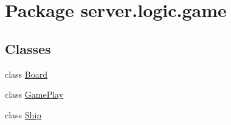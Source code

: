 \hypertarget{namespaceserver_1_1logic_1_1game}{}\section{Package server.\+logic.\+game}
\label{namespaceserver_1_1logic_1_1game}
\subsection*{Classes}
\begin{DoxyCompactItemize}
\item 
class \hyperlink{classserver_1_1logic_1_1game_1_1_board}{Board}
\item 
class \hyperlink{classserver_1_1logic_1_1game_1_1_game_play}{Game\+Play}
\item 
class \hyperlink{classserver_1_1logic_1_1game_1_1_ship}{Ship}
\end{DoxyCompactItemize}
